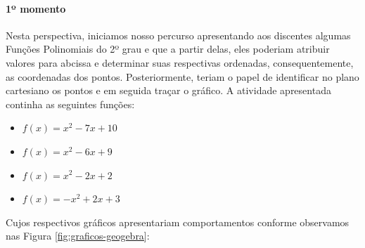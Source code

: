 \begin{refsection}
    \paragraph{1º momento} Nesta perspectiva, iniciamos nosso percurso apresentando aos discentes algumas Funções Polinomiais do 2º grau e que a partir delas, eles poderiam atribuir valores para abcissa e determinar suas respectivas ordenadas, consequentemente, as coordenadas dos pontos. Posteriormente, teriam o papel de identificar no plano cartesiano os pontos e em seguida traçar o gráfico. A atividade apresentada continha as seguintes funções:
    \begin{itemize}
        \item $f(x) =  x^2 - 7x + 10$
        \item $f(x) =  x^2 - 6x +  9$
        \item $f(x) =  x^2 - 2x +  2$
        \item $f(x) = -x^2 + 2x +  3$
    \end{itemize}
    Cujos respectivos gráficos apresentariam comportamentos conforme observamos nas Figura \ref{fig:graficos-geogebra}:


\end{refsection}
